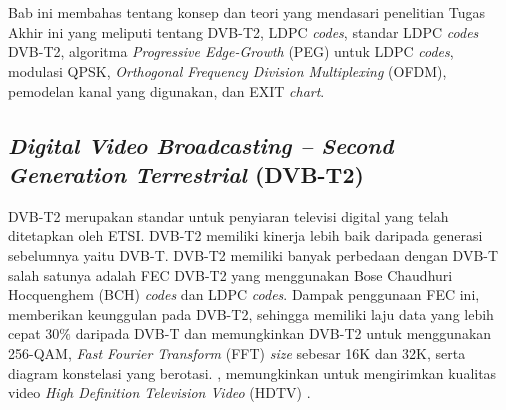 \chapter{\babDua}
Bab ini membahas tentang konsep dan teori yang mendasari penelitian Tugas Akhir ini yang meliputi tentang DVB-T2, LDPC \textit{codes}, standar LDPC \textit{codes} DVB-T2, algoritma \textit{Progressive Edge-Growth} (PEG) untuk LDPC \textit{codes}, modulasi QPSK, \textit{Orthogonal Frequency Division Multiplexing} (OFDM), pemodelan kanal yang digunakan, dan EXIT \textit{chart}.


\section{\textit{Digital Video Broadcasting – Second Generation Terrestrial} (DVB-T2)}
DVB-T2 merupakan standar untuk penyiaran televisi digital yang telah ditetapkan oleh ETSI. DVB-T2 memiliki kinerja lebih baik daripada generasi sebelumnya yaitu DVB-T. DVB-T2 memiliki banyak perbedaan dengan DVB-T salah satunya adalah FEC DVB-T2 yang menggunakan Bose Chaudhuri Hocquenghem (BCH) \textit{codes} dan LDPC \textit{codes}. Dampak penggunaan FEC ini, memberikan keunggulan pada DVB-T2, sehingga memiliki laju data yang lebih cepat $30\%$ daripada DVB-T dan memungkinkan DVB-T2 untuk menggunakan 256-QAM, \textit{Fast Fourier Transform} (FFT) \textit{size} sebesar 16K dan 32K, serta diagram konstelasi yang berotasi. , memungkinkan untuk mengirimkan kualitas video \textit{High Definition Television Video} (HDTV) \cite{etsi2}.

